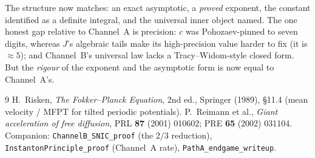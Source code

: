\documentclass[11pt]{article}
\theoremstyle{remark}
\begin{document}
\noindent The structure now matches: an exact asymptotic, a \emph{proved} exponent, the
constant identified as a definite integral, and the universal inner object named. The one
honest gap relative to Channel~A is precision: $c$ was Pohozaev-pinned to seven digits,
whereas $J$'s algebraic tails make its high-precision value harder to fix (it is
$\approx5$); and Channel~B's universal law lacks a Tracy--Widom-style closed form. But the
\emph{rigour} of the exponent and the asymptotic form is now equal to Channel~A's.

\begin{thebibliography}{9}
 H.~Risken, \emph{The Fokker--Planck Equation}, 2nd ed., Springer (1989),
\S11.4 (mean velocity / MFPT for tilted periodic potentials).
 P.~Reimann et al., \emph{Giant acceleration of free diffusion}, PRL
\textbf{87} (2001) 010602; PRE \textbf{65} (2002) 031104.
 Companion: \texttt{ChannelB\_SNIC\_proof} (the $2/3$ reduction),
\texttt{InstantonPrinciple\_proof} (Channel~A rate), \texttt{PathA\_endgame\_writeup}.
\end{thebibliography}
\end{document}
